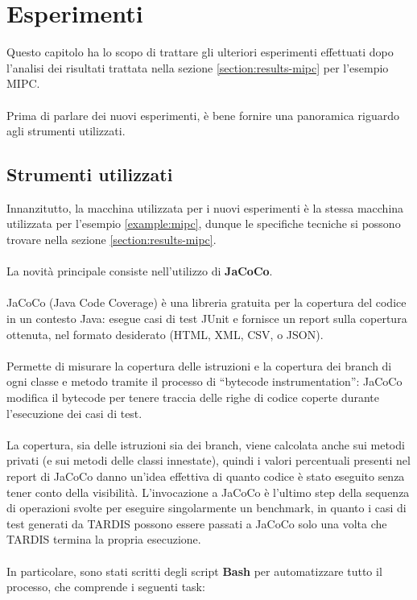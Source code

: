 \documentclass[a4paper, 12pt, oneside]{book}
\newcommand{\qq}[1]{``#1''}
\theoremstyle{normal}
\begin{document}
\chapter{Esperimenti}\label{chapter:experiments}

Questo capitolo ha lo scopo di trattare gli ulteriori esperimenti effettuati dopo l'analisi dei risultati trattata nella sezione \ref{section:results-mipc} per l'esempio MIPC.
\\ \\ Prima di parlare dei nuovi esperimenti, è bene fornire una panoramica riguardo agli strumenti utilizzati.

\section{Strumenti utilizzati}
Innanzitutto, la macchina utilizzata per i nuovi esperimenti è la stessa macchina utilizzata per l'esempio \ref{example:mipc}, dunque le specifiche tecniche si possono trovare nella sezione \ref{section:results-mipc}.
\\ \\ La novità principale consiste nell'utilizzo di \textbf{JaCoCo}.
\\ \\ JaCoCo (Java Code Coverage) \cite{bilal2021jacoco} è una libreria gratuita per la copertura del codice in un contesto Java: esegue casi di test JUnit e fornisce un report sulla copertura ottenuta, nel formato desiderato (HTML, XML, CSV, o JSON). \\ \\ Permette di misurare la copertura delle istruzioni e la copertura dei branch di ogni classe e metodo tramite il processo di \qq{bytecode instrumentation}: JaCoCo modifica il bytecode per tenere traccia delle righe di codice coperte durante l'esecuzione dei casi di test. \\ \\ La copertura, sia delle istruzioni sia dei branch, viene calcolata anche sui metodi privati (e sui metodi delle classi innestate), quindi i valori percentuali presenti nel report di JaCoCo danno un'idea effettiva di quanto codice è stato eseguito senza tener conto della visibilità.
\clearpage \noindent L'invocazione a JaCoCo è l'ultimo step della sequenza di operazioni svolte per eseguire singolarmente un benchmark, in quanto i casi di test generati da TARDIS possono essere passati a JaCoCo solo una volta che TARDIS termina la propria esecuzione. 
\\ \\ In particolare, sono stati scritti degli script \textbf{Bash} per automatizzare tutto il processo, che comprende i seguenti task:
\end{document}
